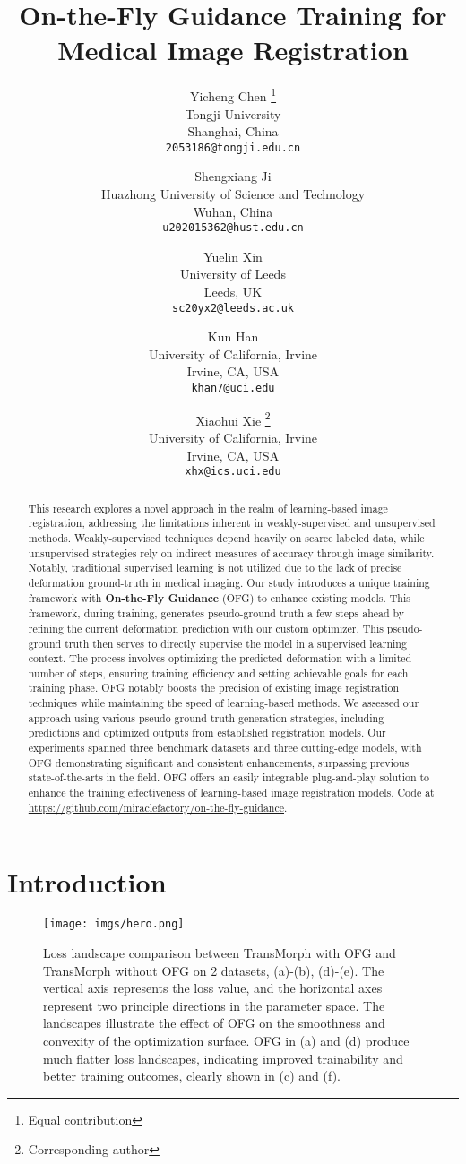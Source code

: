 \documentclass[10pt,twocolumn,letterpaper]{article}
\title{On-the-Fly Guidance Training for Medical Image Registration }
\author{Yicheng Chen \thanks{Equal contribution}\\
Tongji University \\
    Shanghai, China\\
    {\tt\small 2053186@tongji.edu.cn} 
    \and
    Shengxiang Ji \footnotemark[1]\\
    Huazhong University of Science and Technology\\
    Wuhan, China\\
    {\tt\small u202015362@hust.edu.cn} 
    \and
    Yuelin Xin \footnotemark[1]\\
    University of Leeds\\
    Leeds, UK\\
    {\tt\small sc20yx2@leeds.ac.uk} 
    \and
    Kun Han\\
    University of California, Irvine\\
    Irvine, CA, USA\\
    {\tt\small  khan7@uci.edu}
    \and
    Xiaohui Xie \thanks{Corresponding author}\\
    University of California, Irvine\\
    Irvine, CA, USA\\
    {\tt\small xhx@ics.uci.edu}
}
\begin{document}
\maketitle
\begin{abstract}



This research explores a novel approach in the realm of learning-based image registration, addressing the limitations inherent in weakly-supervised and unsupervised methods. Weakly-supervised techniques depend heavily on scarce labeled data, while unsupervised strategies rely on indirect measures of accuracy through image similarity. Notably, traditional supervised learning is not utilized due to the lack of precise deformation ground-truth in medical imaging. Our study introduces a unique training framework with \textbf{On-the-Fly Guidance} (OFG) to enhance existing models. This framework, during training, generates pseudo-ground truth a few steps ahead by refining the current deformation prediction with our custom optimizer. This pseudo-ground truth then serves to directly supervise the model in a supervised learning context. The process involves optimizing the predicted deformation with a limited number of steps, ensuring training efficiency and setting achievable goals for each training phase. OFG notably boosts the precision of existing image registration techniques while maintaining the speed of learning-based methods. We assessed our approach using various pseudo-ground truth generation strategies, including predictions and optimized outputs from established registration models. Our experiments spanned three benchmark datasets and three cutting-edge models, with OFG demonstrating significant and consistent enhancements, surpassing previous state-of-the-arts in the field. OFG offers an easily integrable plug-and-play solution to enhance the training effectiveness of learning-based image registration models. Code at \url{https://github.com/miraclefactory/on-the-fly-guidance}.

\end{abstract}
 \section{Introduction}
\label{sec:intro}



\begin{figure}[t]
\begin{center}
   \texttt{[image: imgs/hero.png]}
\end{center}
   \caption{Loss landscape comparison between TransMorph with OFG and TransMorph without OFG on 2 datasets, (a)-(b), (d)-(e). The vertical axis represents the loss value, and the horizontal axes represent two principle directions in the parameter space. The landscapes illustrate the effect of OFG on the smoothness and convexity of the optimization surface. OFG in (a) and (d) produce much flatter loss landscapes, indicating improved trainability and better training outcomes, clearly shown in (c) and (f).}
   \label{fig:hero}
\end{figure}
\end{document}
